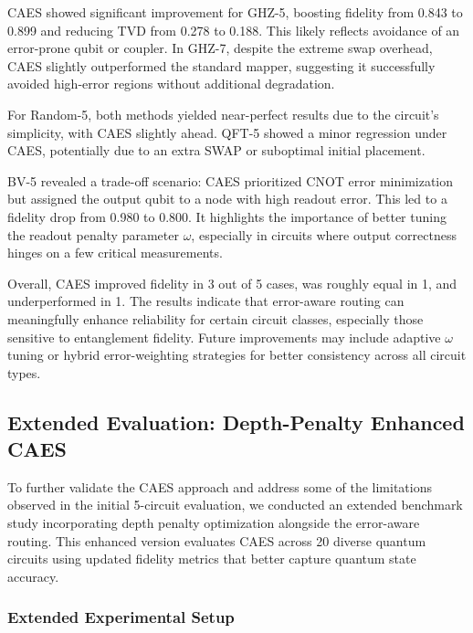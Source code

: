 \documentclass[conference]{IEEEtran}
\begin{document}
CAES showed significant improvement for GHZ-5, boosting fidelity from 0.843 to 0.899 and reducing TVD from 0.278 to 0.188. This likely reflects avoidance of an error-prone qubit or coupler. In GHZ-7, despite the extreme swap overhead, CAES slightly outperformed the standard mapper, suggesting it successfully avoided high-error regions without additional degradation.

For Random-5, both methods yielded near-perfect results due to the circuit's simplicity, with CAES slightly ahead. QFT-5 showed a minor regression under CAES, potentially due to an extra SWAP or suboptimal initial placement.

BV-5 revealed a trade-off scenario: CAES prioritized CNOT error minimization but assigned the output qubit to a node with high readout error. This led to a fidelity drop from 0.980 to 0.800. It highlights the importance of better tuning the readout penalty parameter $\omega$, especially in circuits where output correctness hinges on a few critical measurements.

Overall, CAES improved fidelity in 3 out of 5 cases, was roughly equal in 1, and underperformed in 1. The results indicate that error-aware routing can meaningfully enhance reliability for certain circuit classes, especially those sensitive to entanglement fidelity. Future improvements may include adaptive $\omega$ tuning or hybrid error-weighting strategies for better consistency across all circuit types.

\subsection{Extended Evaluation: Depth-Penalty Enhanced CAES}

To further validate the CAES approach and address some of the limitations observed in the initial 5-circuit evaluation, we conducted an extended benchmark study incorporating depth penalty optimization alongside the error-aware routing. This enhanced version evaluates CAES across 20 diverse quantum circuits using updated fidelity metrics that better capture quantum state accuracy.

\subsubsection{Extended Experimental Setup}
\end{document}
